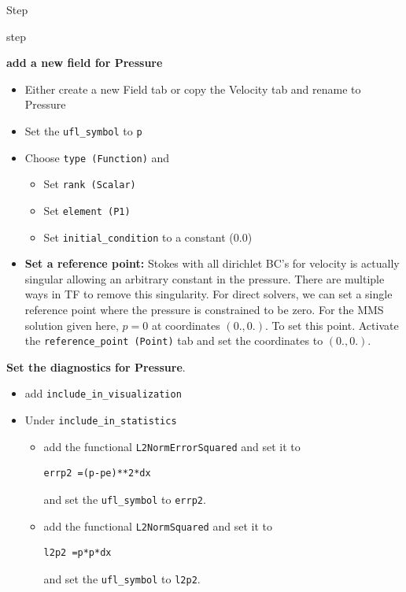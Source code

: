 \begin{steps}{Step}
\begin{steps}{step}
    \item \textbf{add a new field for Pressure}
      \begin{itemize}
      \item Either create a new Field tab or copy the Velocity tab and
        rename to Pressure
      \item Set the \texttt{ufl\_symbol} to \texttt{p}
      \item Choose \texttt{type (Function)} and
        \begin{itemize}
        \item Set \texttt{rank (Scalar)}
        \item Set \texttt{element (P1)}
        \item Set \texttt{initial\_condition} to a constant (0.0)
        \end{itemize}
      \item \textbf{Set a reference point:}  Stokes with all dirichlet
        BC's for velocity is actually singular allowing an arbitrary
        constant in the pressure.  There are multiple ways in TF to
        remove this singularity.  For direct solvers, we can set  a single reference
        point where the pressure is constrained to be zero. For
        the MMS solution given here, $p=0$ at coordinates $(0.,0.)$.
        To set this point.  Activate the \texttt{reference\_point
          (Point)} tab and set the coordinates to $(0.,0.)$.
      \end{itemize}
  \item \textbf{Set the diagnostics for Pressure}. 
    \begin{itemize}
    \item add \texttt{include\_in\_visualization}
    \item Under \texttt{include\_in\_statistics}
      \begin{itemize}
      \item add the functional
      \texttt{L2NormErrorSquared} and set it to
      \begin{lstlisting}[style=Ufl]
        errp2 =(p-pe)**2*dx
      \end{lstlisting}
      and set the \texttt{ufl\_symbol} to \texttt{errp2}.
    \item add the functional \texttt{L2NormSquared} and set it to
      \begin{lstlisting}[style=Ufl]
        l2p2 =p*p*dx
      \end{lstlisting}
      and set the \texttt{ufl\_symbol} to \texttt{l2p2}.
      \end{itemize}

\end{itemize}
\end{steps}
\end{steps}
